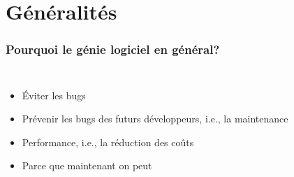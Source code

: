 \documentclass{beamer}
\begin{document}
    \section{Généralités}
    \begin{frame}
        \transdissolve
        \frametitle{Pourquoi le génie logiciel en général?}
        \begin{columns}
            \begin{itemize}

                \item Éviter les bugs
                \item Prévenir les bugs des futurs développeurs, i.e., la maintenance
                \item Performance, i.e., la réduction des coûts
                \item Parce que maintenant on peut
            \end{itemize}
            \centering
        \end{columns}
    \end{frame}
\end{document}
